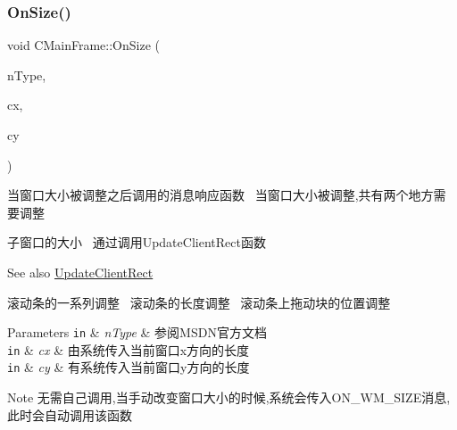 \subsubsection{\texorpdfstring{On\+Size()}{OnSize()}}
{\footnotesize\ttfamily void C\+Main\+Frame\+::\+On\+Size (\begin{DoxyParamCaption}\item[{U\+I\+NT}]{n\+Type,  }\item[{int}]{cx,  }\item[{int}]{cy }\end{DoxyParamCaption})}



当窗口大小被调整之后调用的消息响应函数~\newline
当窗口大小被调整,共有两个地方需要调整~\newline



\begin{DoxyItemize}
\item 子窗口的大小~\newline
通过调用\+Update\+Client\+Rect函数 \begin{DoxySeeAlso}{See also}
\hyperlink{class_c_main_frame_a2500e3a6ace77e01430f5ff4b9a6f182}{Update\+Client\+Rect}
\end{DoxySeeAlso}

\item 滚动条的一系列调整~\newline
 滚动条的长度调整~\newline
 滚动条上拖动块的位置调整 
\begin{DoxyParams}[1]{Parameters}
\mbox{\tt in}  & {\em n\+Type} & 参阅\+M\+S\+D\+N官方文档 \\
\hline
\mbox{\tt in}  & {\em cx} & 由系统传入当前窗口x方向的长度 \\
\hline
\mbox{\tt in}  & {\em cy} & 有系统传入当前窗口y方向的长度 \\
\hline
\end{DoxyParams}
\begin{DoxyNote}{Note}
无需自己调用,当手动改变窗口大小的时候,系统会传入\+O\+N\+\_\+\+W\+M\+\_\+\+S\+I\+Z\+E消息,此时会自动调用该函数 
\end{DoxyNote}

\end{DoxyItemize}\mbox{\label{class_c_main_frame_a969c7e78dee0c54e7bcbe2ab9c901cc2}} 
